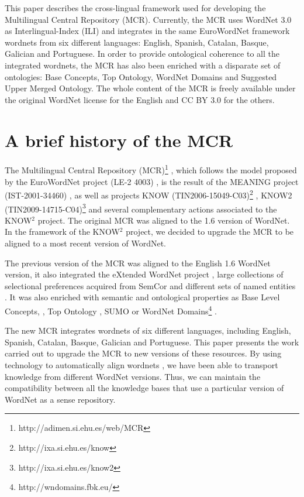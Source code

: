 \documentclass[runningheads]{llncs}
\begin{document}
This paper describes the cross-lingual framework used for developing the Multilingual Central Repository (MCR). Currently, the MCR uses WordNet 3.0 as Interlingual-Index (ILI) and integrates in the same EuroWordNet framework wordnets from six different languages: English, Spanish, Catalan, Basque, Galician and Portuguese. In order to provide ontological coherence to all the integrated wordnets, the MCR has also been enriched with a disparate set of ontologies: Base Concepts,  Top Ontology, WordNet Domains and Suggested Upper Merged Ontology.  
The whole content of the MCR is freely available under  the original WordNet license for the English and CC BY 3.0 for the others.

\section{A brief history of the MCR} %

The Multilingual Central Repository (MCR)\footnote{http://adimen.si.ehu.es/web/MCR} \cite{atserias04}, which follows the model proposed by the EuroWordNet project (LE-2 4003) \cite{Vossen:1998}, is the result of the MEANING project (IST-2001-34460) \cite{rigau02}, as well as projects KNOW (TIN2006-15049-C03)\footnote{http://ixa.si.ehu.es/know} \cite{agirre09}, KNOW2 (TIN2009-14715-C04)\footnote{http://ixa.si.ehu.es/know2} and several complementary actions associated  to the KNOW$^2$ project. The original MCR was aligned to the 1.6 version of WordNet. In the framework of the KNOW$^2$ project, we decided to upgrade the MCR to be aligned to a most recent version of WordNet.

The previous version of the MCR was aligned to the English 1.6 WordNet version, it also integrated the eXtended WordNet project \cite{mihalcea01}, large collections of selectional preferences acquired from SemCor \cite{AgirreMartinez01} and different sets of named entities \cite{AlfonsecaManandhar02}. It was also enriched with semantic and ontological properties as  Base Level Concepts, \cite{izquierdo2007BLCs}, Top Ontology \cite{AAC08},  SUMO \cite{Niles+Pease'01} or WordNet Domains\footnote{http://wndomains.fbk.eu/} \cite{magnini00,bentivogli2004revising}.

The new MCR  integrates wordnets of six different languages, including English, Spanish, Catalan, Basque, Galician and Portuguese. This paper presents the work carried out to upgrade the MCR to new versions of these resources. By using technology to automatically align wordnets \cite{daude03}, we have been able to transport knowledge from different WordNet versions. Thus, we can maintain the compatibility between all the knowledge bases that use a particular version of WordNet as a sense repository. 
\end{document}
